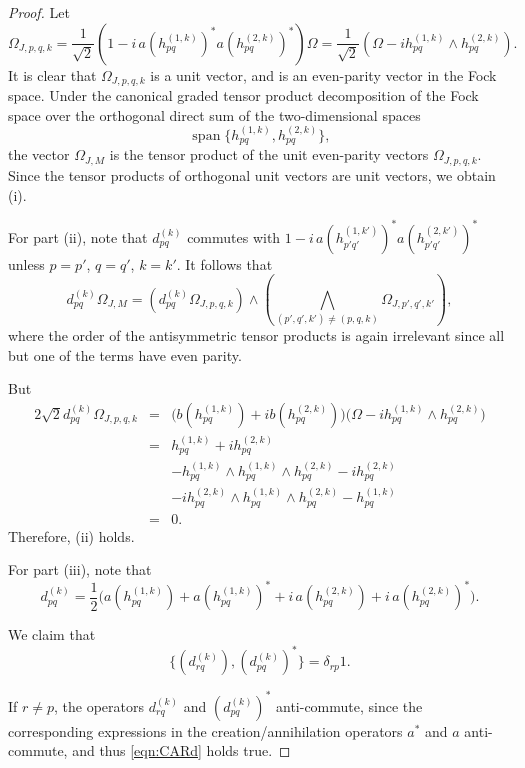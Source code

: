 \documentclass[10pt,a4paper]{amsart}
\begin{document}
\begin{proof}
Let \[\Omega_{J, p,q,k}= \frac{1}{\sqrt{2}}\left(
      1-i\,a(h^{(1,k)}_{pq})^*a(h^{(2,k)}_{pq})^*
    \right)\Omega = \frac{1}{\sqrt{2}}\left(\Omega - i h^{(1,k)}_{pq}\wedge h^{(2,k)}_{pq}\right).\] It is clear that 
\(\Omega_{J, p,q,k}\) is a unit vector, and is an even-parity vector in the 
Fock space. 
Under the canonical graded tensor product decomposition of the Fock space
over the orthogonal direct sum of the two-dimensional spaces
\[
\operatorname{span}\{h_{pq}^{(1,k)},h_{pq}^{(2,k)}\},
\]
the vector \(\Omega_{J,M}\) is the tensor product of the unit even-parity vectors
\(\Omega_{J,p,q,k}\).  Since the tensor products of orthogonal unit vectors are unit vectors, we obtain (i).

For part (ii), note that $d^{(k)}_{pq}$ commutes with $1-i\,a(h^{(1,k')}_{p'q'})^*a(h^{(2,k')}_{p'q'})^*$ unless $p=p'$, $q=q'$, $k=k'$.  It follows that 
\[d^{(k)}_{pq}\Omega_{J,M} = \left(d^{(k)}_{pq} \Omega_{J,p,q,k}\right) 
\wedge \left(\bigwedge_{(p',q',k')\neq (p,q,k)} 
\Omega_{J,p',q',k'}\right), \] where the order of the antisymmetric tensor products is again irrelevant since all but one of the terms have even parity.

But
\begin{eqnarray*}
    2\sqrt{2} d^{(k)}_{pq} \Omega_{J,p,q,k} &=& 
    \bigl(b(h^{(1,k)}_{pq})+i b(h^{(2,k)}_{pq})\bigr) \bigl(\Omega - i h^{(1,k)}_{pq}\wedge h^{(2,k)}_{pq}\bigr) \\ &= & 
    h^{(1,k)}_{pq} + i h^{(2,k)}_{pq} \\
    && - h_{pq}^{(1,k)}\wedge h^{(1,k)}_{pq}\wedge h^{(2,k)}_{pq} - i h_{pq}^{(2,k)} \\
    &&  - i h_{pq}^{(2,k)} \wedge h^{(1,k)}_{pq}\wedge h^{(2,k)}_{pq}
     - h_{pq}^{(1,k)}  \\ &=& 0.
\end{eqnarray*} Therefore, (ii) holds. 

For part (iii), note that 
\[
d_{pq}^{(k)}
=
\frac12\Big(
a(h^{(1,k)}_{pq})
+a(h^{(1,k)}_{pq})^*
+i\,a(h^{(2,k)}_{pq})
+i\,a(h^{(2,k)}_{pq})^*
\Big).
\] 

We claim that 
\begin{equation} \label{eqn:CARd}
\{(d^{(k)}_{rq}), (d^{(k)}_{pq})^*\} = \delta_{rp} 1.
\end{equation}

If $r\neq p$, the operators $d_{rq}^{(k)}$ and $(d_{pq}^{(k)})^*$ anti-commute, since the corresponding expressions in the creation/annihilation operators $a^*$ and $a$ anti-commute, and thus \eqref{eqn:CARd} holds true. 


\end{proof}
\end{document}
